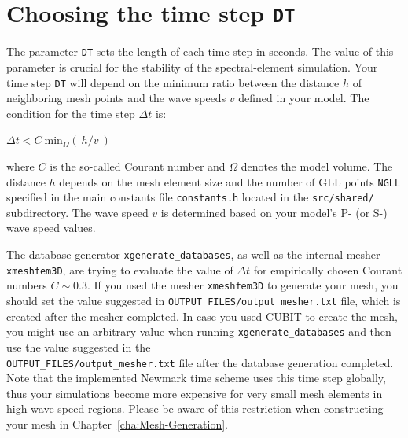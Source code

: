 


\section{Choosing the time step \texttt{DT}}\label{sec:Choosing-the-Time-Step}

The parameter \texttt{DT} sets the length of each time step in seconds.
The value of this parameter is crucial for the stability of the spectral-element
simulation. Your time step \texttt{DT} will depend on the minimum
ratio between the distance $h$ of neighboring mesh points and the
wave speeds $v$ defined in your model. The condition for the time
step $\Delta t$ is:
\begin{lyxcode}
$\Delta t<C~\mathrm{min}_{\Omega}(~h/v~)$
\end{lyxcode}
where $C$ is the so-called Courant number and $\Omega$ denotes the
model volume. The distance $h$ depends on the mesh element size and
the number of GLL points \texttt{NGLL} specified in the main constants
file \texttt{constants.h} located in the \texttt{src/shared/} subdirectory.
The wave speed $v$ is determined based on your model's P- (or S-)
wave speed values.

The database generator \texttt{xgenerate\_databases}, as well as the
internal mesher \texttt{xmeshfem3D}, are trying to evaluate the value
of $\Delta t$ for empirically chosen Courant numbers $C\sim0.3$.
If you used the mesher \texttt{xmeshfem3D} to generate your mesh,
you should set the value suggested in \texttt{OUTPUT\_FILES/output\_mesher.txt}
file, which is created after the mesher completed. In case you used
CUBIT to create the mesh, you might use an arbitrary value when running
\texttt{xgenerate\_databases} and then use the value suggested in
the ~\\
 \texttt{OUTPUT\_FILES/output\_mesher.txt} file after the database
generation completed. Note that the implemented Newmark time scheme
uses this time step globally, thus your simulations become more expensive
for very small mesh elements in high wave-speed regions. Please be
aware of this restriction when constructing your mesh in Chapter~\ref{cha:Mesh-Generation}.

